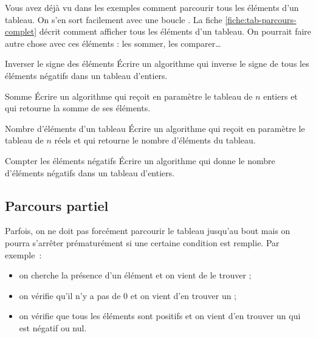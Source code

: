 			Vous avez déjà vu dans les exemples
			comment parcourir tous les éléments d'un tableau.
			On s'en sort facilement avec une boucle .
			La fiche \vref{fiche:tab-parcours-complet}
			décrit comment afficher tous les éléments d'un tableau.
			On pourrait faire autre chose avec ces éléments :
			les sommer, les comparer\dots
				
			\begin{Exercice}{Inverser le signe des éléments}
				Écrire un algorithme qui 
				inverse le signe de tous les éléments négatifs dans un tableau d'entiers.
			\end{Exercice}

			\begin{Exercice}{Somme}
				Écrire un algorithme qui reçoit en paramètre le tableau
				 de $n$ entiers 
				et qui retourne la somme de ses éléments.
			\end{Exercice}

			\begin{Exercice}{Nombre d'éléments d'un tableau}
				Écrire un algorithme qui reçoit en paramètre le tableau
				 de $n$ réels et qui
				retourne le nombre d’éléments du tableau.
			\end{Exercice}
			
			\begin{Exercice}{Compter les éléments négatifs}
				Écrire un algorithme qui
				donne le nombre d'éléments négatifs dans un tableau d'entiers.
			\end{Exercice}

		\subsection{Parcours partiel}
		
			Parfois, on ne doit pas forcément parcourir 
			le tableau jusqu'au bout
			mais on pourra s'arrêter prématurément 
			si une certaine condition est remplie.
			Par exemple~:
			\begin{itemize}
			\item 
				on cherche la présence d'un élément et on vient de le trouver ;
			\item 
				on vérifie qu'il n'y a pas de $0$ et on vient d'en trouver un ;
			\item
				on vérifie que tous les éléments sont positifs
				et on vient d'en trouver un qui est négatif ou nul.
			\end{itemize}
	
